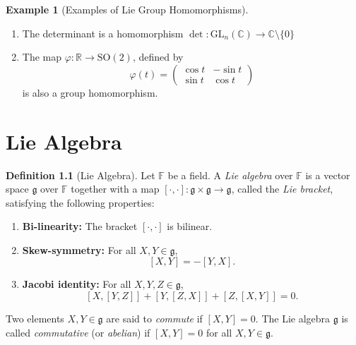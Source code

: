 \documentclass[
]{book}
\theoremstyle{definition}
\newtheorem{definition}{Definition}[chapter]
\theoremstyle{definition}
\newtheorem{example}{Example}[chapter]
\theoremstyle{definition}
\theoremstyle{definition}
\theoremstyle{remark}
\begin{document}
\begin{example}[Examples of Lie Group Homomorphisms]
\protect\hypertarget{exm:unnamed-chunk-9}{}\label{exm:unnamed-chunk-9}\leavevmode

\begin{enumerate}
\def\labelenumi{\arabic{enumi}.}
\item
  The determinant is a homomorphism \(\det : \mathrm{GL}_n(\mathbb{C}) \to \mathbb{C}\setminus \{0\}\)
\item
  The map \(\varphi : \mathbb{R} \to \mathrm{SO}(2)\), defined by
  \[\varphi(t) = \begin{pmatrix} \cos t & -\sin t \\ \sin t & \cos t \end{pmatrix}\]
  is also a group homomorphism.
\end{enumerate}

\end{example}

\chapter{Lie Algebra}\label{lie-algebra}

\begin{definition}[Lie Algebra]
\protect\hypertarget{def:unnamed-chunk-10}{}\label{def:unnamed-chunk-10}Let \(\mathbb{F}\) be a field. A \emph{Lie algebra} over \(\mathbb{F}\) is a vector space \(\mathfrak{g}\) over \(\mathbb{F}\) together with a map \([\cdot,\cdot] : \mathfrak{g} \times \mathfrak{g} \to \mathfrak{g}\), called the \emph{Lie bracket}, satisfying the following properties:

\begin{enumerate}
\def\labelenumi{\arabic{enumi}.}
\item
  \textbf{Bi-linearity:} The bracket \([\cdot,\cdot]\) is bilinear.
\item
  \textbf{Skew-symmetry:} For all \(X,Y \in \mathfrak{g}\),
  \[[X,Y] = -[Y,X].\]
\item
  \textbf{Jacobi identity:} For all \(X,Y,Z \in \mathfrak{g}\),
  \[[X,[Y,Z]] + [Y,[Z,X]] + [Z,[X,Y]] = 0.\]
\end{enumerate}

Two elements \(X,Y \in \mathfrak{g}\) are said to \emph{commute} if \([X,Y] = 0\). The Lie algebra \(\mathfrak{g}\) is called \emph{commutative} (or \emph{abelian}) if \([X,Y] = 0\) for all \(X,Y \in \mathfrak{g}\).
\end{definition}
\end{document}
